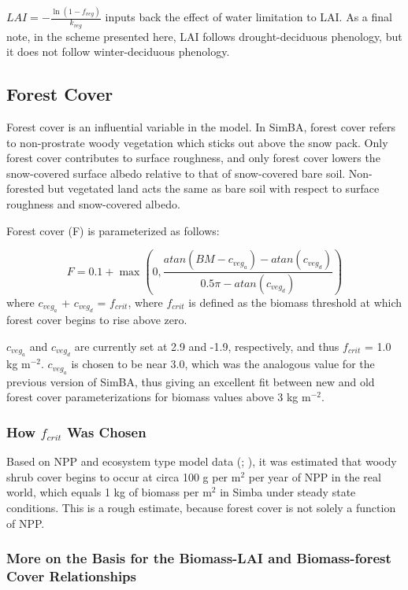 $LAI = -\frac{\ln{(1 - f_{veg})}}{k_{veg}}$ inputs back the effect of water limitation to LAI.  As a final note, in the scheme presented here, LAI follows drought-deciduous phenology, but it does not follow winter-deciduous phenology.

\subsection{Forest Cover}

Forest cover is an influential variable in the model.  In SimBA, forest cover refers to non-prostrate woody vegetation which sticks out above the snow pack.  Only forest cover contributes to surface roughness, and only forest cover lowers the snow-covered surface albedo relative to that of snow-covered bare soil.  Non-forested but vegetated land acts the same as bare soil with respect to surface roughness and snow-covered albedo.

Forest cover (F) is parameterized as follows:

\begin{equation}
F = 0.1 + \max(0,\frac{atan(BM - c_{{veg}_a}) - atan(c_{{veg}_d})}{0.5\pi - atan(c_{{veg}_d})})
\end{equation}
where 
$c_{{veg}_a}$ + $c_{{veg}_d}$ = $f_{crit}$, where $f_{crit}$ is defined as the biomass threshold at which forest cover begins to rise above zero.

$c_{{veg}_a}$ and $c_{{veg}_d}$ are currently set at 2.9 and -1.9, respectively, and thus $f_{crit}$ = 1.0 kg m$^{-2}$.  $c_{{veg}_a}$ is chosen to be near 3.0, which was the analogous value for the previous version of SimBA, thus giving an excellent fit between new and old forest cover parameterizations for biomass values above 3 kg m$^{-2}$.

\subsubsection{How $f_{crit}$ Was Chosen} 

Based on NPP and ecosystem type model data 
(\cite{mcguire1992}; \cite{cramer1999}), it was estimated that woody shrub cover begins to occur at circa 100 g per m$^2$ per year of NPP in the real world, which equals 1 kg of biomass per m$^2$ in Simba under steady state conditions.
This is a rough estimate, because forest cover is not solely a function of NPP.

\subsubsection{More on the Basis for the Biomass-LAI and Biomass-forest Cover Relationships}

